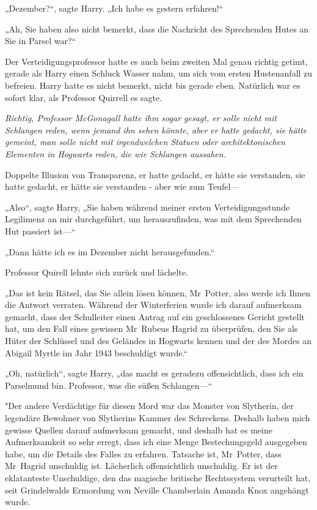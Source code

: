 {„Dezember?“, sagte Harry. „Ich habe es gestern erfahren!“

„Ah, Sie haben also nicht bemerkt, dass die Nachricht des Sprechenden Hutes an Sie in Parsel war?“

Der Verteidigungsprofessor hatte es auch beim zweiten Mal genau richtig getimt, gerade als Harry einen Schluck Wasser nahm, um sich vom ersten Hustenanfall zu befreien. Harry hatte es nicht bemerkt, nicht bis gerade eben. Natürlich war es sofort klar, als Professor Quirrell es sagte.

\emph{Richtig, Professor McGonagall hatte ihm sogar gesagt, er solle nicht mit Schlangen reden, wenn jemand ihn sehen könnte, aber er hatte gedacht, sie hätte gemeint, man solle nicht mit irgendwelchen Statuen oder architektonischen Elementen in Hogwarts reden, die wie Schlangen aussahen.}

Doppelte Illusion von Transparenz, er hatte gedacht, er hätte sie verstanden, sie hatte gedacht, er hätte sie verstanden - aber wie zum Teufel—

„Also“, sagte Harry, „Sie haben während meiner ersten Verteidigungsstunde Legilimenz an mir durchgeführt, um herauszufinden, was mit dem Sprechenden Hut passiert ist—“

„Dann hätte ich es im Dezember nicht herausgefunden.“

Professor Quirell lehnte sich zurück und lächelte.

„Das ist kein Rätsel, das Sie allein lösen können, Mr~Potter, also werde ich Ihnen die Antwort verraten. Während der Winterferien wurde ich darauf aufmerksam gemacht, dass der Schulleiter einen Antrag auf ein geschlossenes Gericht gestellt hat, um den Fall eines gewissen Mr~Rubeus Hagrid zu überprüfen, den Sie als Hüter der Schlüssel und des Geländes in Hogwarts kennen und der des Mordes an Abigail Myrtle im Jahr 1943 beschuldigt wurde.“

„Oh, natürlich“, sagte Harry, „das macht es geradezu offensichtlich, dass ich ein Parselmund bin. Professor, was die süßen Schlangen—“

"Der andere Verdächtige für diesen Mord war das Monster von Slytherin, der legendäre Bewohner von Slytherins Kammer des Schreckens. Deshalb haben mich gewisse Quellen darauf aufmerksam gemacht, und deshalb hat es meine Aufmerksamkeit so sehr erregt, dass ich eine Menge Bestechungsgeld ausgegeben habe, um die Details des Falles zu erfahren. Tatsache ist, Mr~Potter, dass Mr~Hagrid unschuldig ist. Lächerlich offensichtlich unschuldig. Er ist der eklatanteste Unschuldige, den das magische britische Rechtssystem verurteilt hat, seit Grindelwalds Ermordung von Neville Chamberlain Amanda Knox angehängt wurde.

}

